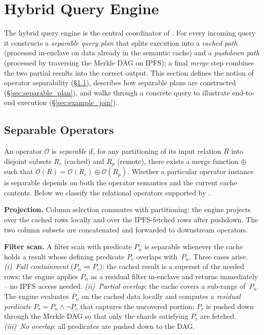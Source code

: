 
\section{Hybrid Query Engine}
\label{sec:hqe}
 
The hybrid query engine is the central coordinator of \ours{}.
For every incoming query it constructs a \emph{separable query plan}
that splits execution into a \emph{cached path} (processed in-enclave
on data already in the semantic cache) and a \emph{pushdown path}
(processed by traversing the Merkle DAG on IPFS); a final
\emph{merge} step combines the two partial results into the correct
output.  This section defines the notion of operator separability
(\S\ref{sec:separable_ops}), describes how separable plans are
constructed (\S\ref{sec:separable_plan}), and walks through a
concrete query to illustrate end-to-end execution
(\S\ref{sec:example_join}).
 
\subsection{Separable Operators}
\label{sec:separable_ops}
 
An operator $\mathcal{O}$ is \emph{separable} if, for any partitioning
of its input relation $R$ into disjoint subsets $R_c$ (cached) and
$R_p$ (remote), there exists a merge function $\oplus$ such that
$\mathcal{O}(R) = \mathcal{O}(R_c) \oplus \mathcal{O}(R_p)$. Whether a particular operator instance is separable depends on both the operator semantics and the current cache contents.  Below we classify the relational operators supported by \ours{}.
 
\textbf{Projection.} Column selection commutes with partitioning: the engine projects
over the cached rows locally and over the IPFS-fetched rows after
pushdown.  The two column subsets are concatenated and forwarded
to downstream operators.
 
\textbf{Filter scan.} A filter scan with predicate $P_n$ is separable whenever the cache
holds a result whose defining predicate $P_c$ overlaps with~$P_n$.
Three cases arise.
\emph{(i)~Full containment} ($P_n \Rightarrow P_c$): the cached
result is a superset of the needed rows; the engine applies $P_n$
as a residual filter in-enclave and returns immediately -- no IPFS
access needed.
\emph{(ii)~Partial overlap}: the cache covers a sub-range of~$P_n$.
The engine evaluates $P_n$ on the cached data locally and computes
a \emph{residual predicate} $P_r = P_n \wedge \neg P_c$ that
captures the uncovered portion; $P_r$ is pushed down through the
Merkle DAG so that only the shards satisfying $P_r$ are fetched.
\emph{(iii)~No overlap}: all predicates are pushed down to the DAG.
 
